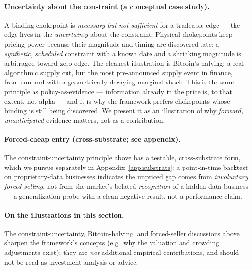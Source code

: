 \documentclass[11pt]{article}
\begin{document}
\paragraph{Uncertainty about the constraint (a conceptual case study).} A binding chokepoint is
\emph{necessary but not sufficient} for a tradeable edge --- the edge lives in the \emph{uncertainty}
about the constraint. Physical chokepoints keep pricing power because their magnitude and timing are
discovered late; a \emph{synthetic, scheduled} constraint with a known date and a shrinking magnitude
is arbitraged toward zero edge. The cleanest illustration is Bitcoin's halving: a real algorithmic
supply cut, but the most pre-announced supply event in finance, front-run and with a geometrically
decaying marginal shock. This is the same principle as policy-as-evidence --- information already in
the price is, to that extent, not alpha --- and it is why the framework prefers chokepoints whose
binding is still being discovered. We present it as an illustration of why \emph{forward,
unanticipated} evidence matters, not as a contribution.

\paragraph{Forced-cheap entry (cross-substrate; see appendix).} The constraint-uncertainty principle
above has a testable, cross-substrate form, which we pursue separately in Appendix~\ref{app:substrate}:
a point-in-time backtest on proprietary-data businesses indicates the unpriced gap comes from
\emph{involuntary forced selling}, not from the market's belated \emph{recognition} of a hidden data
business --- a generalization probe with a clean negative result, not a performance claim.

\paragraph{On the illustrations in this section.} The constraint-uncertainty, Bitcoin-halving, and
forced-seller discussions above sharpen the framework's concepts (e.g.\ why the valuation and crowding
adjustments exist); they are \emph{not} additional empirical contributions, and should not be read as
investment analysis or advice.
\end{document}
